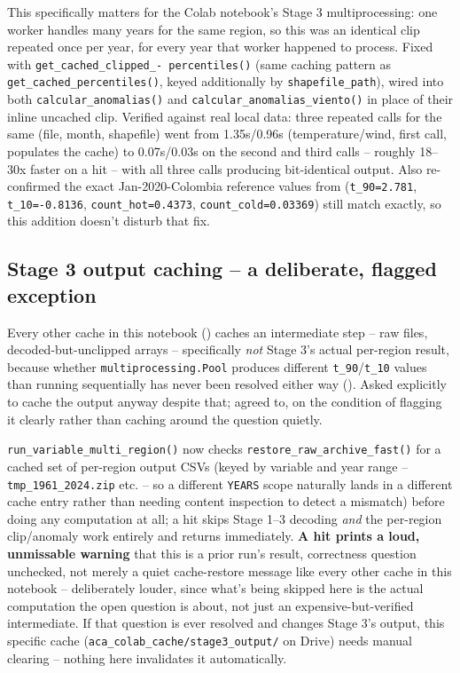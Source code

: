 \documentclass[11pt]{article}
\begin{document}
This specifically matters for the Colab notebook's Stage 3 multiprocessing:
one worker handles many years for the same region, so this was an
identical clip repeated once per year, for every year that worker
happened to process. Fixed with \texttt{get\_cached\_clipped\_-
percentiles()} (same caching pattern as \texttt{get\_cached\_percentiles()},
keyed additionally by \texttt{shapefile\_path}), wired into both
\texttt{calcular\_anomalias()} and \texttt{calcular\_anomalias\_viento()}
in place of their inline uncached clip. Verified against real local data:
three repeated calls for the same (file, month, shapefile) went from
1.35s/0.96s (temperature/wind, first call, populates the cache) to
0.07s/0.03s on the second and third calls -- roughly 18--30x faster on a
hit -- with all three calls producing bit-identical output. Also
re-confirmed the exact Jan-2020-Colombia reference values from
 (\texttt{t\_90=2.781},
\texttt{t\_10=-0.8136}, \texttt{count\_hot=0.4373},
\texttt{count\_cold=0.03369}) still match exactly, so this addition
doesn't disturb that fix.

\subsection{Stage 3 output caching -- a deliberate, flagged exception}
\label{sec:stage3-output-cache}

Every other cache in this notebook () caches an intermediate step -- raw files,
decoded-but-unclipped arrays -- specifically \emph{not} Stage 3's actual
per-region result, because whether \texttt{multiprocessing.Pool} produces
different \texttt{t\_90}/\texttt{t\_10} values than running sequentially
has never been resolved either way (). Asked
explicitly to cache the output anyway despite that; agreed to, on the
condition of flagging it clearly rather than caching around the question
quietly.

\texttt{run\_variable\_multi\_region()} now checks
\texttt{restore\_raw\_archive\_fast()} for a cached set of per-region
output CSVs (keyed by variable and year range --
\texttt{tmp\_1961\_2024.zip} etc. -- so a different \texttt{YEARS} scope
naturally lands in a different cache entry rather than needing content
inspection to detect a mismatch) before doing any computation at all; a
hit skips Stage 1--3 decoding \emph{and} the per-region clip/anomaly
work entirely and returns immediately. \textbf{A hit prints a loud,
unmissable warning} that this is a prior run's result, correctness
question unchecked, not merely a quiet cache-restore message like every
other cache in this notebook -- deliberately louder, since what's being
skipped here is the actual computation the open question is about, not
just an expensive-but-verified intermediate. If that question is ever
resolved and changes Stage 3's output, this specific cache
(\texttt{aca\_colab\_cache/stage3\_output/} on Drive) needs manual
clearing -- nothing here invalidates it automatically.
\end{document}
